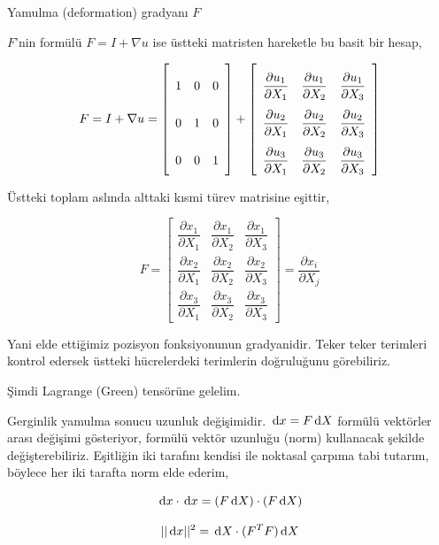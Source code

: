 \documentclass[12pt,fleqn]{article}\usepackage{../../common}
\begin{document}
Yamulma (deformation) gradyanı $F$

$F$'nin formülü $F = I + \nabla u$ ise üstteki matristen hareketle bu basit
bir hesap,

$$
F = I + \nabla u = 
\left[\begin{array}{ccc}
1 & 0 & 0 \\ 0 & 1 & 0 \\ 0 & 0 & 1
\end{array}\right] + 
\renewcommand*{\arraystretch}{2.5}
\left[\begin{array}{ccc}
\dfrac{\partial u_1}{\partial X_1} & \dfrac{\partial u_1}{\partial X_2} & \dfrac{\partial u_1}{\partial X_3} \\
\dfrac{\partial u_2}{\partial X_1} & \dfrac{\partial u_2}{\partial X_2} & \dfrac{\partial u_2}{\partial X_3} \\
\dfrac{\partial u_3}{\partial X_1} & \dfrac{\partial u_3}{\partial X_2} & \dfrac{\partial u_3}{\partial X_3} 
\end{array}\right]
$$

Üstteki toplam aslında alttaki kısmi türev matrisine eşittir,

$$
\renewcommand*{\arraystretch}{2.5}
F = \left[\begin{array}{ccc}
\dfrac{\partial x_1}{\partial X_1} & \dfrac{\partial x_1}{\partial X_2} & \dfrac{\partial x_1}{\partial X_3} \\
\dfrac{\partial x_2}{\partial X_1} & \dfrac{\partial x_2}{\partial X_2} & \dfrac{\partial x_2}{\partial X_3} \\
\dfrac{\partial x_3}{\partial X_1} & \dfrac{\partial x_3}{\partial X_2} & \dfrac{\partial x_3}{\partial X_3} 
\end{array}\right] =
\frac{\partial x_i}{\partial X_j}
$$

Yani elde ettiğimiz pozisyon fonksiyonunun gradyanidir. Teker teker terimleri
kontrol edersek üstteki hücrelerdeki terimlerin doğruluğunu görebiliriz.

Şimdi Lagrange (Green) tensörüne gelelim.

Gerginlik yamulma sonucu uzunluk değişimidir. $\,\mathrm{d} x = F \,\mathrm{d} X$ formülü
vektörler arası değişimi gösteriyor, formülü vektör uzunluğu (norm) kullanacak
şekilde değişterebiliriz. Eşitliğin iki tarafını kendisi ile noktasal çarpıma
tabi tutarım, böylece her iki tarafta norm elde ederim,

$$
\,\mathrm{d} x \cdot \,\mathrm{d} x  = (F \,\mathrm{d} X) \cdot (F \,\mathrm{d} X)
$$

$$
||\,\mathrm{d} x||^2  = \,\mathrm{d} X \cdot (F^T F) \,\mathrm{d} X
$$
\end{document}
